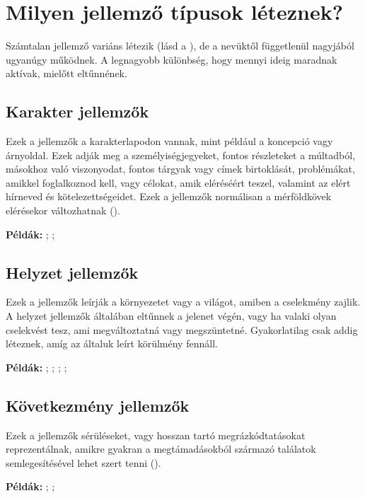\section{Milyen jellemző típusok léteznek?}

Számtalan jellemző variáns létezik (lásd a ), de a nevüktől függetlenül nagyjából ugyanúgy működnek. A legnagyobb különbség, hogy mennyi ideig maradnak aktívak, mielőtt eltűnnének.

\subsection{Karakter jellemzők}

Ezek a jellemzők a karakterlapodon vannak, mint például a koncepció vagy árnyoldal. Ezek adják meg a személyiségjegyeket, fontos részleteket a múltadból, másokhoz való viszonyodat, fontos tárgyak vagy címek birtoklását, problémákat, amikkel foglalkoznod kell, vagy célokat, amik eléréséért teszel, valamint az elért hírneved és kötelezettségeidet. Ezek a jellemzők normálisan a mérföldkövek elérésekor változhatnak ().

\textbf{Példák:} ; ; 

\subsection{Helyzet jellemzők}

Ezek a jellemzők leírják a környezetet vagy a világot, amiben a cselekmény zajlik. A helyzet jellemzők általában eltűnnek a jelenet végén, vagy ha valaki olyan cselekvést tesz, ami megváltoztatná vagy megszüntetné. Gyakorlatilag csak addig léteznek, amíg az általuk leírt körülmény fennáll.

\textbf{Példák:} ; ; ; ; 

\subsection{Következmény jellemzők}

Ezek a jellemzők sérüléseket, vagy hosszan tartó megrázkódtatásokat reprezentálnak, amikre gyakran a megtámadásokból származó találatok semlegesítésével lehet szert tenni ().

\textbf{Példák:} ; ; 


